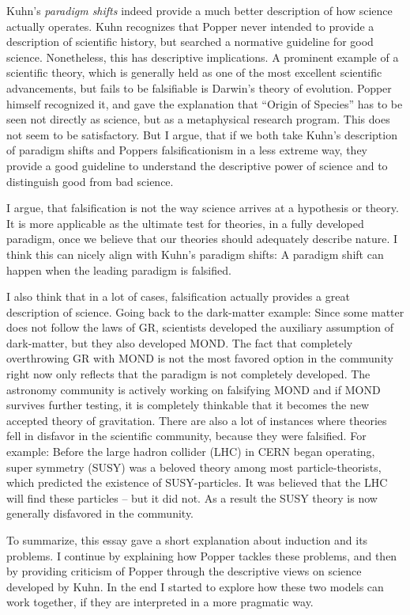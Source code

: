 Kuhn's \emph{paradigm shifts} indeed provide a much better description of
how science actually operates. Kuhn recognizes that
Popper never intended to provide a description of scientific history,
but searched a normative guideline for good science.
Nonetheless, this has descriptive implications.
A prominent example of a scientific theory, which is
generally held as one of the most excellent scientific advancements,
but fails to be falsifiable is Darwin's theory of evolution.
Popper himself recognized it, and gave the explanation that
\enquote{Origin of Species} has to be seen not directly as science, but
as a metaphysical research program\cite[197]{philsciencebook}. This does not seem to be satisfactory.
But I argue, that if we both take Kuhn's description of paradigm shifts
and Poppers falsificationism in a less extreme way, they provide
a good guideline to understand the descriptive power of science and
to distinguish good from bad science.

I argue, that
falsification is not the way science arrives at a hypothesis or theory.
It is more applicable as the ultimate test for theories,
in a fully developed paradigm, once we believe
that our theories should adequately describe nature.
I think this can nicely align with Kuhn's paradigm shifts:
A paradigm shift can happen when the leading paradigm
is falsified.

I also think that in a lot of cases, falsification actually
provides a great description of science.
Going back to the dark-matter example:
Since some matter does not follow the laws of GR,
scientists developed the auxiliary assumption of dark-matter, but
they also developed MOND.
The fact that completely overthrowing GR with MOND is
not the most favored option in the community right now only reflects
that the paradigm is not completely developed.
The astronomy community is actively working on
falsifying MOND and if MOND survives further testing, it is completely
thinkable that it becomes the new accepted theory of gravitation.
There are also a lot of instances where theories fell in
disfavor in the scientific community, because they were falsified.
For example: Before the large hadron collider (LHC) in CERN began operating,
super symmetry (SUSY) was a beloved theory among most particle-theorists, which
predicted the existence of SUSY-particles.
It was believed that the LHC will find these particles -- but it did not.
As a result the SUSY theory is now generally disfavored in the community.

To summarize, this essay gave a short explanation about induction and its problems.
I continue by explaining how Popper tackles these problems, and then by
providing criticism of Popper through the descriptive
views on science developed by Kuhn.
In the end I started to explore how these two models can work together,
if they are interpreted in a more pragmatic way.